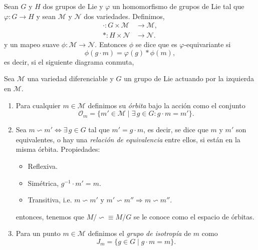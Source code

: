 \begin{mydef}
Sean $G$ y $H$ dos grupos de Lie y $\varphi$ un homomorfismo de grupos de Lie tal que $\varphi: G \rightarrow H$ y sean $\mathcal{M}$ y $\mathcal{N}$ dos variedades. Definimos,
%
\begin{align*}
\cdot : G \times \mathcal{M} & \longrightarrow \mathcal{M}, \\
* : H \times \mathcal{N} & \longrightarrow \mathcal{N}.
\end{align*}
%
y un mapeo suave $\phi: \mathcal{M} \rightarrow \mathcal{N}$.
Entonces $\phi$ se dice que es $\varphi$-equivariante si $$\phi(g \cdot m) = \varphi (g) * \phi(m),$$ es decir, si el siguiente diagrama conmuta,
%
\begin{center}
\end{center}
%
\end{mydef}

\begin{mydef}
Sea $\mathcal{M}$ una variedad diferenciable y $G$ un grupo de Lie actuando por la izquierda en $\mathcal{M}$.
%
\begin{enumerate}
\item{Para cualquier $m \in \mathcal{M}$ definimos su \emph{\'{o}rbita} bajo la acci\'{o}n como el conjunto $$\mathcal{O}_{m} = \{m' \in \mathcal{M} \; \vert \; \exists \, g \in G : g \cdot m = m'\}.$$}
\item{Sea $m \backsim m' \Leftrightarrow \exists \, g \in G$ tal que $m' = g \cdot m$, es decir, se dice que $m$ y $m'$ son equivalentes, o hay una \emph{relaci\'{o}n de equivalencia} entre ellos, si est\'{a}n en la misma \'{o}rbita. Propiedades:
%
\begin{itemize}
\item{Reflexiva.}
\item{Sim\'{e}trica, $g^{-1} \cdot m' = m$.}
\item{Transitiva, i.e. $m \backsim m'$ y $m' \backsim m'' \Rightarrow m \backsim m''$.}
\end{itemize}
%
entonces, tenemos que $M/\backsim \equiv M/G$ se le conoce como el espacio de \'{o}rbitas.}
\item{Para un punto $m \in \mathcal{M}$ definimos el \emph{grupo de isotrop\'{i}a} de $m$ como $$J_{m} = \{g \in G \; \vert \; g \cdot m = m\}.$$}
\end{enumerate}
%
\end{mydef}

